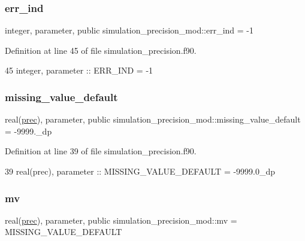 \subsubsection{\texorpdfstring{err\+\_\+ind}{err\_ind}}
{\footnotesize\ttfamily integer, parameter, public simulation\+\_\+precision\+\_\+mod\+::err\+\_\+ind = -\/1}



Definition at line 45 of file simulation\+\_\+precision.\+f90.


\begin{DoxyCode}
45     \textcolor{keywordtype}{integer},  \textcolor{keywordtype}{parameter}   :: ERR\_IND  = -1
\end{DoxyCode}
\mbox{\label{namespacesimulation__precision__mod_a1fb0f91226452bb43d4c61cae32a9a6d}} 
\subsubsection{\texorpdfstring{missing\+\_\+value\+\_\+default}{missing\_value\_default}}
{\footnotesize\ttfamily real(\mbox{\hyperlink{namespacesimulation__precision__mod_aaff1ddf996761a1e11e787d63e1612f6}{prec}}), parameter, public simulation\+\_\+precision\+\_\+mod\+::missing\+\_\+value\+\_\+default = -\/9999.\+\_\+dp}



Definition at line 39 of file simulation\+\_\+precision.\+f90.


\begin{DoxyCode}
39     \textcolor{keywordtype}{real(prec)}, \textcolor{keywordtype}{parameter} :: MISSING\_VALUE\_DEFAULT = -9999.0\_dp
\end{DoxyCode}
\mbox{\label{namespacesimulation__precision__mod_a39845d8a0d331a7b9225feb5fe19ba3b}} 
\subsubsection{\texorpdfstring{mv}{mv}}
{\footnotesize\ttfamily real(\mbox{\hyperlink{namespacesimulation__precision__mod_aaff1ddf996761a1e11e787d63e1612f6}{prec}}), parameter, public simulation\+\_\+precision\+\_\+mod\+::mv = M\+I\+S\+S\+I\+N\+G\+\_\+\+V\+A\+L\+U\+E\+\_\+\+D\+E\+F\+A\+U\+LT}



